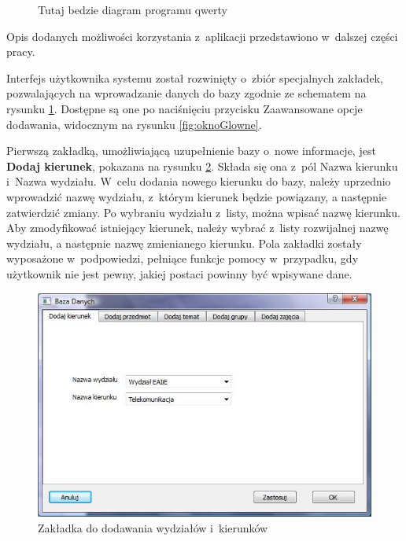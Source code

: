 \begin{figure}
\begin{center}
\caption{Tutaj bedzie diagram programu qwerty}
\label{fig:program}
\end{center}
\end{figure}

Opis dodanych możliwości korzystania z~aplikacji przedstawiono w~dalszej części pracy.

Interfejs użytkownika systemu został rozwinięty o~zbiór specjalnych zakładek, pozwalających na wprowadzanie danych do bazy zgodnie ze schematem na rysunku \ref{fig:program}. Dostępne są one po naciśnięciu przycisku Zaawansowane opcje dodawania, widocznym na rysunku \ref{fig:oknoGlowne}. 

Pierwszą zakładką, umożliwiającą uzupełnienie bazy o~nowe informacje, jest \textbf{Dodaj kierunek}, pokazana na rysunku \ref{fig:dodajSpecjalizacje}. Składa się ona z~pól Nazwa kierunku i~Nazwa wydziału. W~celu dodania nowego kierunku do bazy, należy uprzednio wprowadzić nazwę wydziału, z~którym kierunek będzie powiązany, a następnie zatwierdzić zmiany. Po wybraniu wydziału z~listy, można wpisać nazwę kierunku. Aby zmodyfikować istniejący kierunek, należy wybrać z~listy rozwijalnej nazwę wydziału, a następnie nazwę zmienianego kierunku. Pola zakładki zostały wyposażone w~podpowiedzi, pełniące funkcje pomocy w~przypadku, gdy użytkownik nie jest pewny, jakiej postaci powinny być wpisywane dane. 
\begin{figure}
\begin{center}
\includegraphics[scale=0.7]{dodaj_kierunek.jpg}
\caption{Zakładka do dodawania wydziałów i~kierunków}
\label{fig:dodajSpecjalizacje}
\end{center}
\end{figure}

